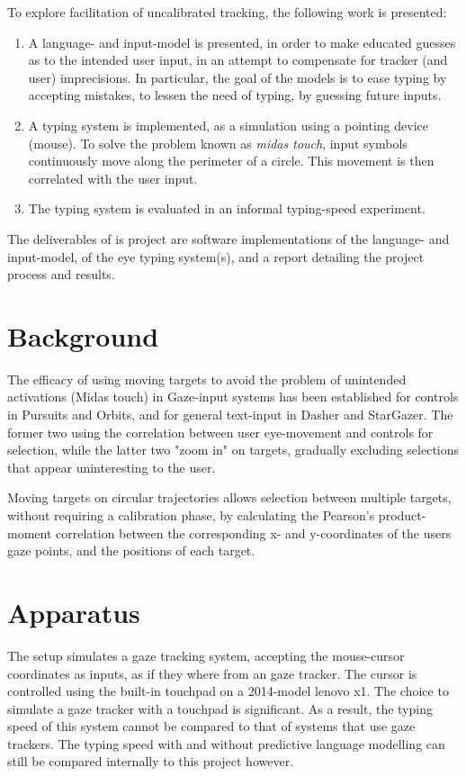 \documentclass[a4paper, titlepage]{article}
\renewcommand{\%}{\scalebox{.9}{\oldpct}}
\begin{document}
To explore facilitation of uncalibrated tracking, the following work is
presented:
\begin{enumerate}
\item
  A language- and input-model is presented, in order
  to make educated guesses as to the intended user input, in an attempt
  to compensate for tracker (and user) imprecisions. In particular, the goal of
  the models is to ease typing by accepting mistakes, to lessen the need of
  typing, by guessing future inputs.
\item
  A typing system is implemented, as a simulation using a
  pointing device (mouse). To solve the problem known as
  \emph{midas touch}, input symbols continuously move along the perimeter of a
  circle. This movement is then correlated with the user input.
\item
  The typing system is evaluated in an informal typing-speed experiment.
\end{enumerate}

The deliverables of is project are software implementations of the
language- and input-model, of the eye typing system(s), and a report
detailing the project process and results.

\section{Background}
The efficacy of using moving targets to avoid the problem of unintended
activations (Midas touch) in Gaze-input systems has been established for
controls in Pursuits\cite{pursuits} and Orbits\cite{orbits}, and for general
text-input in Dasher \cite{dasher} and StarGazer\cite{stargazer}. The former two
using the correlation between user eye-movement and controls for selection,
while the latter two "zoom in" on targets, gradually excluding selections that
appear uninteresting to the user.

Moving targets on circular trajectories allows selection between multiple
targets, without requiring a calibration phase\cite{pursuits,orbits}, by
calculating the Pearson's product-moment correlation between the corresponding
x- and y-coordinates of the users gaze points, and the positions of each target.

\section{Apparatus}
The setup simulates a gaze tracking system, accepting the mouse-cursor
coordinates as inputs, as if they where from an gaze tracker. The cursor is
controlled using the built-in touchpad on a 2014-model lenovo x1.
The choice to simulate a gaze tracker with a touchpad is significant. As a
result, the typing speed of this system cannot be compared to that of systems
that use gaze trackers. The typing speed with and without predictive language
modelling can still be compared internally to this project however.
\end{document}

